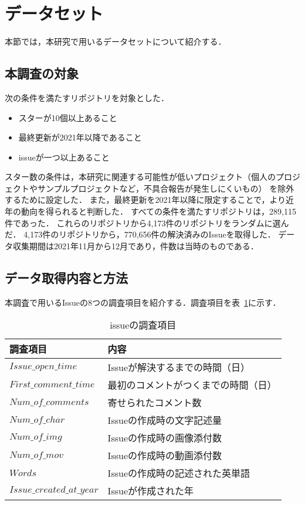 \section{データセット}
本節では，本研究で用いるデータセットについて紹介する．

\subsection{本調査の対象}
次の条件を満たすリポジトリを対象とした．
\begin{itemize}
    \item スターが10個以上あること
    \item 最終更新が2021年以降であること
    \item issueが一つ以上あること
\end{itemize}
スター数の条件は，本研究に関連する可能性が低いプロジェクト（個人のプロジェクトやサンプルプロジェクトなど，不具合報告が発生しにくいもの）
を除外するために設定した．
また，最終更新を2021年以降に限定することで，より近年の動向を得られると判断した．
すべての条件を満たすリポジトリは，289,115件であった．
これらのリポジトリから4,173件のリポジトリをランダムに選んだ．
4,173件のリポジトリから，770,656件の解決済みのIssueを取得した．
データ収集期間は2021年11月から12月であり，件数は当時のものである．

\subsection{データ取得内容と方法}
本調査で用いるIssueの8つの調査項目を紹介する．調査項目を表~\ref{issue_parameter}に示す．

\begin{table}[t]
    \begin{center}
    \caption{issueの調査項目}
    \renewcommand{\arraystretch}{1.3}
    \begin{tabular}{l|l} 
        \hline
        調査項目 & 内容 \\ 
        \hline \hline
        $Issue\_open\_time$ & Issueが解決するまでの時間（日） \\
        $First\_comment\_time$ & 最初のコメントがつくまでの時間（日） \\
        $Num\_of\_comments$ & 寄せられたコメント数 \\
        $Num\_of\_char$ & Issueの作成時の文字記述量 \\
        $Num\_of\_img$ & Issueの作成時の画像添付数 \\
        $Num\_of\_mov$ & Issueの作成時の動画添付数 \\
        $Words$ & Issueの作成時の記述された英単語 \\
        $Issue\_created\_at\_year$ & Issueが作成された年 \\
        \hline
    \end{tabular}
    \label{issue_parameter}
    \end{center}
\end{table}

